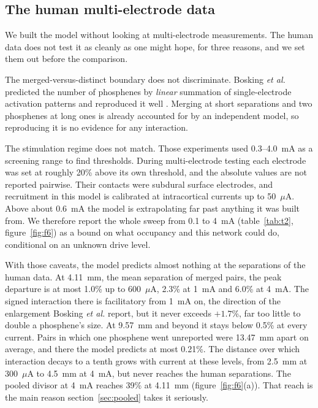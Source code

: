 \documentclass[10pt,twocolumn]{article}
\newcommand{\uA}{\ensuremath{\mu\text{A}}}
\begin{document}
\subsection{The human multi-electrode data}
\label{sec:human}

We built the model without looking at multi-electrode measurements. The
human data does not test it as cleanly as one might hope, for three
reasons, and we set them out before the comparison.

The merged-versus-distinct boundary does not discriminate. Bosking
\textit{et al.} predicted the number of phosphenes by \emph{linear}
summation of single-electrode activation patterns and reproduced it well
\citep{bosking2022}. Merging at short separations and two phosphenes at
long ones is already accounted for by an independent model, so
reproducing it is no evidence for any interaction.

The stimulation regime does not match. Those experiments used 0.3--4.0~mA
as a screening range to find thresholds. During multi-electrode testing
each electrode was set at roughly 20\% above its own threshold, and the
absolute values are not reported pairwise. Their contacts were subdural
surface electrodes, and recruitment in this model is calibrated at
intracortical currents up to 50~\uA. Above about 0.6~mA the model is
extrapolating far past anything it was built from. We therefore report the
whole sweep from 0.1 to 4~mA (table~\ref{tab:t2}, figure~\ref{fig:f6}) as
a bound on what occupancy and this network could do, conditional on an
unknown drive level.

With those caveats, the model predicts almost nothing at the separations
of the human data. At 4.11~mm, the mean separation of merged pairs, the
peak departure is at most 1.0\% up to 600~\uA, 2.3\% at 1~mA and 6.0\%
at 4~mA. The signed interaction there is facilitatory from 1~mA on, the
direction of the enlargement Bosking \textit{et al.} report, but it never
exceeds $+1.7$\%, far too little to double a phosphene's size. At 9.57~mm
and beyond it stays below 0.5\% at every current. Pairs in which one
phosphene went unreported were 13.47~mm apart on average, and there the
model predicts at most 0.21\%. The distance over which interaction decays
to a tenth grows with current at these levels, from 2.5~mm at 300~\uA{}
to 4.5~mm at 4~mA, but never reaches the human separations. The pooled
divisor at 4~mA reaches 39\% at 4.11~mm (figure~\ref{fig:f6}(a)). That
reach is the main reason section~\ref{sec:pooled} takes it seriously.
\end{document}
